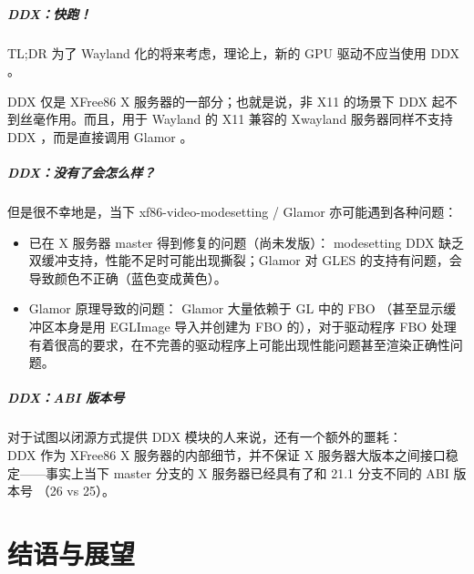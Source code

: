 \documentclass{ctexbeamer}
\begin{document}
\begin{frame}
    \frametitle{DDX：快跑！}
    \begin{alertblock}{TL;DR}
        为了 Wayland 化的将来考虑，理论上，新的 GPU 驱动不应当使用 DDX 。
    \end{alertblock}
    DDX 仅是 XFree86 X 服务器的一部分；也就是说，非 X11 的场景下 DDX 起不到丝毫作用。而且，用于 Wayland 的 X11 兼容的 Xwayland 服务器同样不支持 DDX ，而是直接调用 Glamor 。
\end{frame}

\begin{frame}
    \frametitle{DDX：没有了会怎么样？}
    但是很不幸地是，当下 xf86-video-modesetting / Glamor 亦可能遇到各种问题：
    \begin{itemize}
        \item 已在 X 服务器 master 得到修复的问题（尚未发版）： modesetting DDX 缺乏双缓冲支持，性能不足时可能出现撕裂；Glamor 对 GLES 的支持有问题，会导致颜色不正确（蓝色变成黄色）。
        \item Glamor 原理导致的问题： Glamor 大量依赖于 GL 中的 FBO （甚至显示缓冲区本身是用 EGLImage 导入并创建为 FBO 的），对于驱动程序 FBO 处理有着很高的要求，在不完善的驱动程序上可能出现性能问题甚至渲染正确性问题。
    \end{itemize}
\end{frame}

\begin{frame}
    \frametitle{DDX：ABI 版本号}
    对于试图以闭源方式提供 DDX 模块的人来说，还有一个额外的噩耗：\\
    DDX 作为 XFree86 X 服务器的内部细节，并不保证 X 服务器大版本之间接口稳定——事实上当下 master 分支的 X 服务器已经具有了和 21.1 分支不同的 ABI 版本号 （26 vs 25）。
\end{frame}

\part{结语与展望}
\frame{\partpage}

\begin{frame}
    \frametitle{}
\end{frame}
\end{document}
